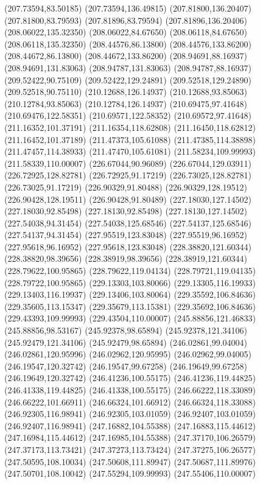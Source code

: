 {(207.73594,83.50185) (207.73594,136.49815) (207.81800,136.20407) (207.81800,83.79593) (207.81896,83.79594) (207.81896,136.20406) (208.06022,135.32350) (208.06022,84.67650)
(208.06118,84.67650) (208.06118,135.32350) (208.44576,86.13800) (208.44576,133.86200) (208.44672,86.13800) (208.44672,133.86200) (208.94691,88.16937) (208.94691,131.83063)
(208.94787,131.83063) (208.94787,88.16937) (209.52422,90.75109) (209.52422,129.24891) (209.52518,129.24890) (209.52518,90.75110) (210.12688,126.14937) (210.12688,93.85063)
(210.12784,93.85063) (210.12784,126.14937) (210.69475,97.41648) (210.69476,122.58351) (210.69571,122.58352) (210.69572,97.41648) (211.16352,101.37191) (211.16354,118.62808)
(211.16450,118.62812) (211.16452,101.37189) (211.47373,105.61088) (211.47385,114.38898) (211.47457,114.38933) (211.47470,105.61081) (211.58234,109.99993) (211.58339,110.00007)
(226.67044,90.96089) (226.67044,129.03911) (226.72925,128.82781) (226.72925,91.17219) (226.73025,128.82781) (226.73025,91.17219) (226.90329,91.80488) (226.90329,128.19512)
(226.90428,128.19511) (226.90428,91.80489) (227.18030,127.14502) (227.18030,92.85498) (227.18130,92.85498) (227.18130,127.14502) (227.54038,94.31454) (227.54038,125.68546)
(227.54137,125.68546) (227.54137,94.31454) (227.95519,123.83048) (227.95519,96.16952) (227.95618,96.16952) (227.95618,123.83048) (228.38820,121.60344) (228.38820,98.39656)
(228.38919,98.39656) (228.38919,121.60344) (228.79622,100.95865) (228.79622,119.04134) (228.79721,119.04135) (228.79722,100.95865) (229.13303,103.80066) (229.13305,116.19933)
(229.13403,116.19937) (229.13406,103.80064) (229.35592,106.84636) (229.35605,113.15347) (229.35679,113.15381) (229.35692,106.84636) (229.43393,109.99993) (229.43504,110.00007)
(245.88856,121.46833) (245.88856,98.53167) (245.92378,98.65894) (245.92378,121.34106) (245.92479,121.34106) (245.92479,98.65894) (246.02861,99.04004) (246.02861,120.95996)
(246.02962,120.95995) (246.02962,99.04005) (246.19547,120.32742) (246.19547,99.67258) (246.19649,99.67258) (246.19649,120.32742) (246.41236,100.55175) (246.41236,119.44825)
(246.41338,119.44825) (246.41338,100.55175) (246.66222,118.33089) (246.66222,101.66911) (246.66324,101.66912) (246.66324,118.33088) (246.92305,116.98941) (246.92305,103.01059)
(246.92407,103.01059) (246.92407,116.98941) (247.16882,104.55388) (247.16883,115.44612) (247.16984,115.44612) (247.16985,104.55388) (247.37170,106.26579) (247.37173,113.73421)
(247.37273,113.73424) (247.37275,106.26577) (247.50595,108.10034) (247.50608,111.89947) (247.50687,111.89976) (247.50701,108.10042) (247.55294,109.99993) (247.55406,110.00007)
}
